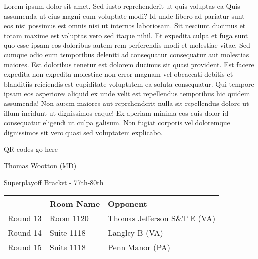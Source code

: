 \documentclass{article}%
\begin{document}
\vspace*{8pt}%
\linebreak%
\newline%
\newline%
Lorem ipsum dolor sit amet. Sed iusto reprehenderit ut quis voluptas ea Quis assumenda ut eius magni eum voluptate modi? Id unde libero ad pariatur sunt eos nisi possimus est omnis nisi ut internos laboriosam. Sit nesciunt ducimus et totam maxime est voluptas vero sed itaque nihil. Et expedita culpa et fuga sunt quo esse ipsam eos doloribus autem rem perferendis modi et molestiae vitae.\newline%
\newline%
Sed cumque odio eum temporibus deleniti ad consequatur consequatur aut molestias maiores. Est doloribus tenetur est dolorem ducimus sit quasi provident. Est facere expedita non expedita molestiae non error magnam vel obcaecati debitis et blanditiis reiciendis est cupiditate voluptatem ea soluta consequatur. Qui tempore ipsam eos asperiores aliquid ex unde velit est repellendus temporibus hic quidem assumenda!\newline%
\newline%
Non autem maiores aut reprehenderit nulla sit repellendus dolore ut illum incidunt ut dignissimos eaque! Ex aperiam minima eos quis dolor id consequatur eligendi ut culpa galisum. Non fugiat corporis vel doloremque dignissimos sit vero quasi sed voluptatem explicabo.\newline%
\newline%
%
\vspace*{30pt}%
\begin{center}%
\begin{Huge}%
QR codes go here%
\end{Huge}%
\end{center}%
\newpage%
\begin{center}%
\begin{Huge}%
Thomas Wootton (MD)%
\end{Huge}%
\vspace*{8pt}%
\linebreak%
\begin{Large}%
Superplayoff Bracket {-} 77th{-}80th%
\end{Large}%
\end{center}%
%
\begin{tabularx}{\textwidth}{|c|Y|Y|}%
\hline%
&Room Name&Opponent\\%
\hline%
Round 13&Room 1120&Thomas Jefferson S\&T E (VA)\\%
Round 14&Suite 1118&Langley B (VA)\\%
Round 15&Suite 1118&Penn Manor (PA)\\%
\hline%
\end{tabularx}%
\end{document}
